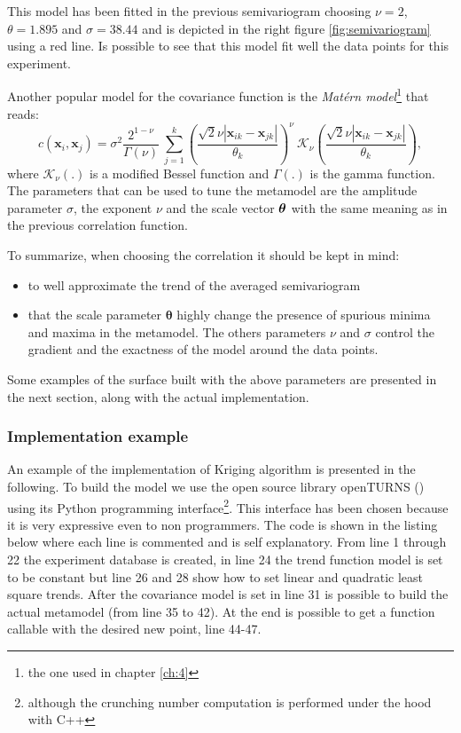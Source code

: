 This model has been fitted in the previous semivariogram choosing $\nu=2$, $\theta=1.895$ and $\sigma=38.44$ and is depicted in the right figure \ref{fig:semivariogram} using a red line. Is possible to see that this model fit well the data points for this experiment.

Another popular model for the covariance function is the \textit{Mat\'ern model}\footnote{the one used in chapter \ref{ch:4}} that reads:
\begin{equation}
c(\mathbf{x}_{i} , \mathbf{x}_{j}) = \sigma^2 \dfrac{2^{1- \nu}}{\Gamma(\nu)} \ \sum_{j=1}^{k} \left( \dfrac{\sqrt{2} \nu |\mathbf{x}_{ik} - \mathbf{x}_{jk} |}{\theta_k} \right)^{\nu} \ \mathcal{K}_{\nu}\left( \dfrac{\sqrt{2} \nu |\mathbf{x}_{ik} - \mathbf{x}_{jk} |}{\theta_k} \right),
\label{eq:matern2}
\end{equation}
where $\mathcal{K}_{\nu}(.)$ is a modified Bessel function and $\Gamma(.)$ is the gamma function.
The parameters that can be used to tune the metamodel are the amplitude parameter $\sigma$, the exponent $\nu$ and the scale vector $\boldsymbol{\theta}$ with the same meaning as in the previous correlation function.

To summarize, when choosing the correlation it should be kept in mind:
\begin{itemize}
	\item to well approximate the trend of the averaged semivariogram
	\item that the scale parameter $\boldsymbol{\theta}$ highly change the presence of spurious minima and maxima in the metamodel. The others parameters $\nu$ and $\sigma$ control the gradient and the exactness of the model around the data points.
\end{itemize}

Some examples of the surface built with the above parameters are presented in the next section, along with the actual implementation.

\subsubsection{Implementation example}
An example of the implementation of Kriging algorithm is presented in the following. To build the model we use the open source library openTURNS (\citet{openturns}) using its Python programming interface\footnote{although the crunching number computation is performed under the hood with C++}. This interface has been chosen because it is very expressive even to non programmers. 
The code is shown in the listing below where each line is commented and is self explanatory. From line 1 through 22 the experiment database is created, in line 24 the trend function model is set to be constant but line 26 and 28 show how to set linear and quadratic least square trends. After the covariance model is set in line 31 is possible to build the actual metamodel (from line 35 to 42). At the end is possible to get a function callable with the desired new point, line 44-47.

